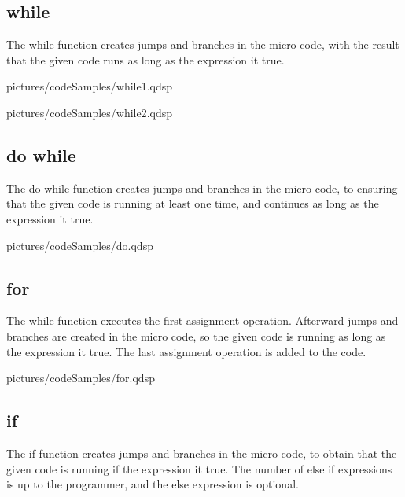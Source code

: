 \subsection{while}

The while function creates jumps and branches in the micro code, with the result that the given code runs as long as the expression it true. 

 
  {pictures/codeSamples/while1.qdsp}


  {pictures/codeSamples/while2.qdsp}

\subsection{do while}

The do while function creates jumps and branches in the micro code, to ensuring that the given code is running at least one time, and continues as long as the expression it true. 


  {pictures/codeSamples/do.qdsp}

\subsection{for}

The while function executes the first assignment operation. Afterward jumps and branches are created in the micro code, so the given code is running as long as the expression it true. The last assignment operation is added to the code.


  {pictures/codeSamples/for.qdsp}
	
\subsection{if}

The if function creates jumps and branches in the micro code, to obtain that the given code is running if the expression it true. The number of else if expressions is up to the programmer, and the else expression is optional.

